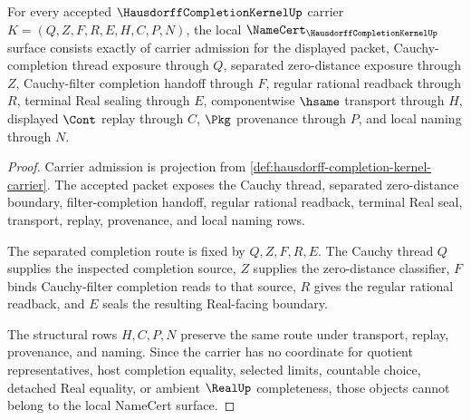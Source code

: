 \begin{theorem}
\label{thm:hausdorff-completion-kernel-namecert-obligations}
For every accepted $\HausdorffCompletionKernelUp$ carrier $K=(Q,Z,F,R,E,H,C,P,N)$, the local $\NameCert_{\HausdorffCompletionKernelUp}$ surface consists exactly of carrier admission for the displayed packet, Cauchy-completion thread exposure through $Q$, separated zero-distance exposure through $Z$, Cauchy-filter completion handoff through $F$, regular rational readback through $R$, terminal Real sealing through $E$, componentwise $\hsame$ transport through $H$, displayed $\Cont$ replay through $C$, $\Pkg$ provenance through $P$, and local naming through $N$.
\end{theorem}
\begin{proof}
Carrier admission is projection from \autoref{def:hausdorff-completion-kernel-carrier}. The accepted packet exposes the Cauchy thread, separated zero-distance boundary, filter-completion handoff, regular rational readback, terminal Real seal, transport, replay, provenance, and local naming rows.

The separated completion route is fixed by $Q,Z,F,R,E$. The Cauchy thread $Q$ supplies the inspected completion source, $Z$ supplies the zero-distance classifier, $F$ binds Cauchy-filter completion reads to that source, $R$ gives the regular rational readback, and $E$ seals the resulting Real-facing boundary.

The structural rows $H,C,P,N$ preserve the same route under transport, replay, provenance, and naming. Since the carrier has no coordinate for quotient representatives, host completion equality, selected limits, countable choice, detached Real equality, or ambient $\RealUp$ completeness, those objects cannot belong to the local NameCert surface.
\end{proof}

